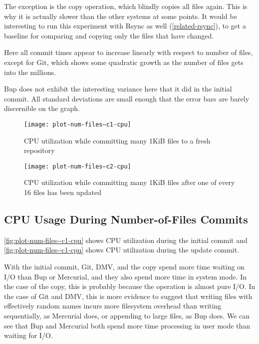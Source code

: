 The exception is the copy operation, which blindly copies all files again. This
is why it is actually slower than the other systems at some points. It would be
interesting to run this experiment with Rsync as well (\autoref{related-rsync}),
to get a baseline for comparing and copying only the files that have changed.

Here all commit times appear to increase linearly with respect to number of
files, except for Git, which shows some quadratic growth as the number of files
gets into the millions.

Bup does not exhibit the interesting variance here that it did in the initial
commit. All standard deviations are small enough that the error bars are barely
discernible on the graph.

%


\begin{figure}[p]
    \caption{CPU utilization while committing many 1KiB files to a fresh
    repository}
    \label{fig:plot-num-files--c1-cpu}
    \centering
    \texttt{[image: plot-num-files--c1-cpu]}
\end{figure}

\begin{figure}[p]
    \caption{CPU utilization while committing many 1KiB files after one of every
        \num{16} files has been updated}
    \label{fig:plot-num-files--c2-cpu}
    \centering
    \texttt{[image: plot-num-files--c2-cpu]}
\end{figure}

\cleardoublepage

\subsection{CPU Usage During Number-of-Files Commits}

\autoref{fig:plot-num-files--c1-cpu} shows CPU utilization during the initial
\gls{commit} and \autoref{fig:plot-num-files--c1-cpu} shows CPU utilization
during the update \gls{commit}.

With the initial commit, Git, DMV, and the copy spend more time waiting on I/O
than Bup or Mercurial, and they also spend more time in system mode. In the case
of the copy, this is probably because the operation is almost pure I/O. In the
case of Git and \gls{DMV}, this is more evidence to suggest that writing files
with effectively random names incurs more filesystem overhead than writing
sequentially, as Mercurial does, or appending to large files, as Bup does. We
can see that Bup and Mercurial both spend more time processing in user mode than
waiting for I/O.

